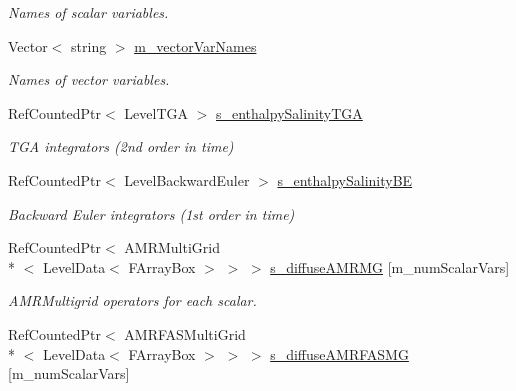 \begin{DoxyCompactItemize}
\begin{DoxyCompactList}\small\item\em Names of scalar variables. \end{DoxyCompactList}\item 
\hypertarget{class_a_m_r_level_mushy_layer_a6f408f55473cdc50d4f5fa9c8cc5649b}{Vector$<$ string $>$ \hyperlink{class_a_m_r_level_mushy_layer_a6f408f55473cdc50d4f5fa9c8cc5649b}{m\-\_\-vector\-Var\-Names}}\label{class_a_m_r_level_mushy_layer_a6f408f55473cdc50d4f5fa9c8cc5649b}

\begin{DoxyCompactList}\small\item\em Names of vector variables. \end{DoxyCompactList}\item 
\hypertarget{class_a_m_r_level_mushy_layer_a424ca17c77e48db3c2ceee5c1874ab68}{Ref\-Counted\-Ptr$<$ Level\-T\-G\-A $>$ \hyperlink{class_a_m_r_level_mushy_layer_a424ca17c77e48db3c2ceee5c1874ab68}{s\-\_\-enthalpy\-Salinity\-T\-G\-A}}\label{class_a_m_r_level_mushy_layer_a424ca17c77e48db3c2ceee5c1874ab68}

\begin{DoxyCompactList}\small\item\em T\-G\-A integrators (2nd order in time) \end{DoxyCompactList}\item 
\hypertarget{class_a_m_r_level_mushy_layer_a5ebc9f4dc4853347b581386dae2f17f3}{Ref\-Counted\-Ptr$<$ Level\-Backward\-Euler $>$ \hyperlink{class_a_m_r_level_mushy_layer_a5ebc9f4dc4853347b581386dae2f17f3}{s\-\_\-enthalpy\-Salinity\-B\-E}}\label{class_a_m_r_level_mushy_layer_a5ebc9f4dc4853347b581386dae2f17f3}

\begin{DoxyCompactList}\small\item\em Backward Euler integrators (1st order in time) \end{DoxyCompactList}\item 
\hypertarget{class_a_m_r_level_mushy_layer_a9b70c8623be78e3b15f34db75987507a}{Ref\-Counted\-Ptr$<$ A\-M\-R\-Multi\-Grid\\*
$<$ Level\-Data$<$ F\-Array\-Box $>$ $>$ $>$ \hyperlink{class_a_m_r_level_mushy_layer_a9b70c8623be78e3b15f34db75987507a}{s\-\_\-diffuse\-A\-M\-R\-M\-G} \mbox{[}m\-\_\-num\-Scalar\-Vars\mbox{]}}\label{class_a_m_r_level_mushy_layer_a9b70c8623be78e3b15f34db75987507a}

\begin{DoxyCompactList}\small\item\em A\-M\-R\-Multigrid operators for each scalar. \end{DoxyCompactList}\item 
\hypertarget{class_a_m_r_level_mushy_layer_ac9929ee850f10e1ffc3cf31811b4751c}{Ref\-Counted\-Ptr$<$ A\-M\-R\-F\-A\-S\-Multi\-Grid\\*
$<$ Level\-Data$<$ F\-Array\-Box $>$ $>$ $>$ \hyperlink{class_a_m_r_level_mushy_layer_ac9929ee850f10e1ffc3cf31811b4751c}{s\-\_\-diffuse\-A\-M\-R\-F\-A\-S\-M\-G} \mbox{[}m\-\_\-num\-Scalar\-Vars\mbox{]}}\label{class_a_m_r_level_mushy_layer_ac9929ee850f10e1ffc3cf31811b4751c}


\end{DoxyCompactItemize}
